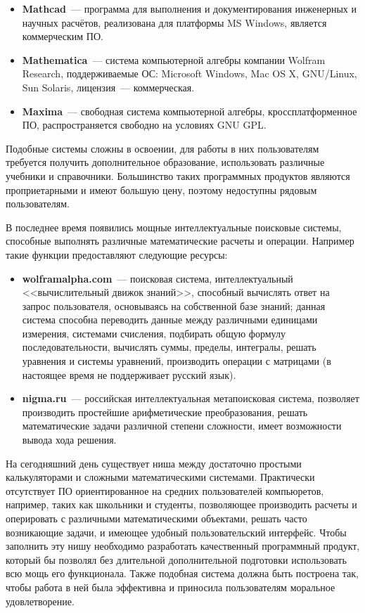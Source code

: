 \begin{itemize}
\item {\bf Mathcad}~--- программа для выполнения и документирования инженерных 
и научных расчётов, реализована для платформы MS Windows, является 
коммерческим ПО.

\item {\bf Mathematica}~--- система компьютерной алгебры компании Wolfram Research, 
поддерживаемые ОС: Microsoft Windows, Mac OS X, GNU/Linux, Sun Solaris, 
лицензия~--- коммерческая.

\item {\bf Maxima}~--- свободная система компьютерной алгебры, 
кроссплатформенное ПО, распространяется свободно на условиях GNU GPL.
\end{itemize}
Подобные системы сложны в освоении, для работы в них пользователям 
требуется получить дополнительное образование, использовать 
различные учебники и справочники. Большинство таких программных продуктов
являются проприетарными и имеют большую цену, поэтому недоступны 
рядовым пользователям.

В последнее время появились мощные интеллектуальные поисковые системы, 
способные выполнять различные математические расчеты и операции. 
Например такие функции предоставляют следующие ресурсы: 
\begin{itemize}
\item {\bf wolframalpha.com}~--- поисковая система, интеллектуальный 
<<вычислительный движок знаний>>, способный вычислять ответ 
на запрос пользователя, основываясь на собственной базе знаний; 
данная система способна переводить данные между различными 
единицами измерения, системами счисления, подбирать общую 
формулу последовательности, вычислять суммы, пределы, интегралы, 
решать уравнения и системы уравнений, производить операции с матрицами 
(в настоящее время не поддерживает русский язык).

\item {\bf nigma.ru}~--- российская интеллектуальная метапоисковая система, 
позволяет производить простейшие арифметические преобразования, 
решать математические задачи различной степени сложности, 
имеет возможности вывода хода решения.
\end{itemize}

На сегодняшний день существует ниша между достаточно простыми 
калькуляторами и сложными математическими системами. 
Практически отсутствует ПО ориентированное на средних 
пользователей компьюретов, например, таких как школьники и студенты, 
позволяющее производить расчеты и оперировать с различными 
математическими объектами, решать часто возникающие задачи, 
и имеющее удобный пользовательский интерфейс. 
Чтобы заполнить эту нишу необходимо разработать качественный 
программный продукт, который бы позволял без длительной 
дополнительной подготовки использовать всю мощь его функционала.
Также подобная система должна быть построена так, чтобы работа в ней 
была эффективна и приносила пользователям моральное удовлетворение.

